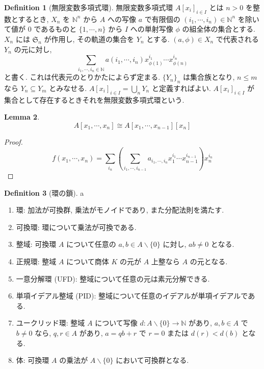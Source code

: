 \documentclass[a4paper,dvipdfmx]{jsarticle}
\theoremstyle{plain}
\theoremstyle{definition}
\theoremstyle{plain}
\numberwithin{equation}{section}
\numberwithin{theorem}{section}
\numberwithin{definition}{section}
\numberwithin{note}{section}
\theoremstyle{definition}
\newtheorem{dfn}{Definition}[section]
\newtheorem{lem}[dfn]{Lemma}
\begin{document}
\begin{dfn}[無限変数多項式環]
  無限変数多項式環 $A[x_i]_{i\in I}$ とは $n > 0$ を整数とするとき, $X_n$ を $\mathbb{N}^n$ から $A$ への写像 $a$ で有限個の $(i_1,\cdots,i_n)\in\mathbb{N}^n$ を除いて値が $0$ であるものと $\lbrace1,\cdots,n\rbrace$ から $I$ への単射写像 $\phi$ の組全体の集合とする. $X_n$ には $\mathfrak{S}_n$ が作用し, その軌道の集合を $Y_n$ とする. $(a,\phi)\in X_n$ で代表される $Y_n$ の元に対し,
  $$\sum_{i_1,\cdots,i_n\in\mathbb{N}}a(i_1,\cdots,i_n)x_{\phi(1)}^{i_1}\cdots x_{\phi(n)}^{i_n}$$
  と書く. これは代表元のとりかたによらず定まる. $\lbrace Y_n\rbrace_n$ は集合族となり, $n\leq m$ なら $Y_n \subseteq Y_m$ とみなせる. $A[x_i]_{i\in I} = \bigcup_n Y_n$ と定義すればよい. $A[x_i]_{i\in I}$ が集合として存在するときそれを無限変数多項式環という.
\end{dfn}

\begin{lem}
  $$
    A[x_1,\cdots,x_n]\cong A[x_1,\cdots,x_{n-1}][x_n]
  $$
\end{lem}
\begin{proof}
  $$
    f(x_1,\cdots,x_n) = \sum_{i_n}\left(\sum_{i_1,\cdots,i_{n-1}}a_{i_1,\cdots,i_n}x_1^{i_1}\cdots x_{n-1}^{i_{n-1}}\right)x_n^{i_n}
  $$
\end{proof}

\begin{dfn}[環の鎖] a
  \begin{enumerate}
    \item 環: 加法が可換群, 乗法がモノイドであり, また分配法則を満たす.
    \item 可換環: 環について乗法が可換である.
    \item 整域: 可換環 $A$ について任意の $a,b\in A\backslash\lbrace0\rbrace$ に対し, $ab\neq 0$ となる.
    \item 正規環: 整域 $A$ について商体 $K$ の元が $A$ 上整なら $A$ の元となる.
    \item 一意分解環 (UFD): 整域について任意の元は素元分解できる.
    \item 単項イデアル整域 (PID): 整域について任意のイデアルが単項イデアルである.
    \item ユークリッド環: 整域 $A$ について写像 $d:A\backslash\lbrace0\rbrace\to\mathbb{N}$ があり, $a,b\in A$ で $b\neq 0$ なら, $q,r\in A$ があり, $a = qb + r$ で $r = 0$ または $d(r)<d(b)$ となる.
    \item 体: 可換環 $A$ の乗法が $A\backslash\lbrace0\rbrace$ において可換群となる.
  \end{enumerate}
\end{dfn}
\end{document}
